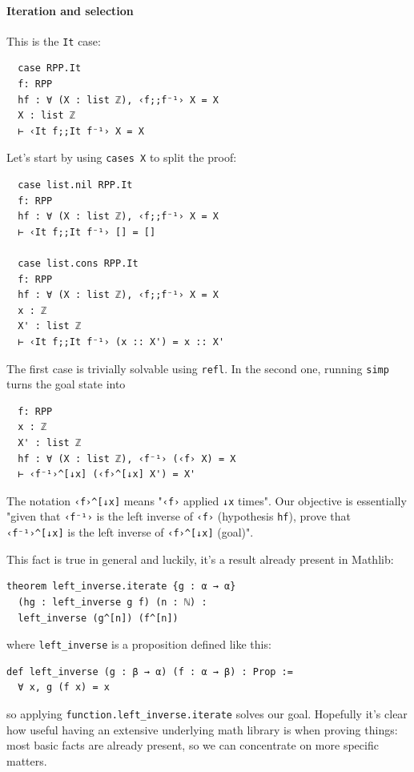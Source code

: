 \documentclass{book}
\theoremstyle{definition}
\theoremstyle{remark}
\theoremstyle{plain}
\begin{document}
\paragraph{Iteration and selection}
This is the \lstinline{It} case:
\begin{lstlisting}
  case RPP.It
  f: RPP
  hf : ∀ (X : list ℤ), ‹f;;f⁻¹› X = X
  X : list ℤ
  ⊢ ‹It f;;It f⁻¹› X = X
\end{lstlisting}
Let's start by using \lstinline{cases X} to split the proof:
\begin{lstlisting}
  case list.nil RPP.It
  f: RPP
  hf : ∀ (X : list ℤ), ‹f;;f⁻¹› X = X
  ⊢ ‹It f;;It f⁻¹› [] = []

  case list.cons RPP.It
  f: RPP
  hf : ∀ (X : list ℤ), ‹f;;f⁻¹› X = X
  x : ℤ
  X' : list ℤ
  ⊢ ‹It f;;It f⁻¹› (x :: X') = x :: X'
\end{lstlisting}
The first case is trivially solvable using \lstinline{refl}.
In the second one, running \lstinline{simp} turns the goal state into
\begin{lstlisting}
  f: RPP
  x : ℤ
  X' : list ℤ
  hf : ∀ (X : list ℤ), ‹f⁻¹› (‹f› X) = X
  ⊢ ‹f⁻¹›^[↓x] (‹f›^[↓x] X') = X'
\end{lstlisting}
The notation \lstinline{‹f›^[↓x]} means "\lstinline{‹f›} applied \lstinline{↓x} times".
Our objective is essentially "given that \lstinline{‹f⁻¹›} is the left inverse of \lstinline{‹f›} (hypothesis \lstinline{hf}),
prove that \lstinline{‹f⁻¹›^[↓x]} is the left inverse of \lstinline{‹f›^[↓x]} (goal)".

This fact is true in general and luckily, it's a result already present in Mathlib:
\begin{lstlisting}
theorem left_inverse.iterate {g : α → α}
  (hg : left_inverse g f) (n : ℕ) :
  left_inverse (g^[n]) (f^[n])
\end{lstlisting}
where \lstinline{left_inverse} is a proposition defined like this:
\begin{lstlisting}
def left_inverse (g : β → α) (f : α → β) : Prop :=
  ∀ x, g (f x) = x
\end{lstlisting}
so applying \lstinline{function.left_inverse.iterate} solves our goal.
Hopefully it's clear how useful having an extensive underlying math library is when proving things:
most basic facts are already present, so we can concentrate on more specific matters.

\paragraph{}
\end{document}
